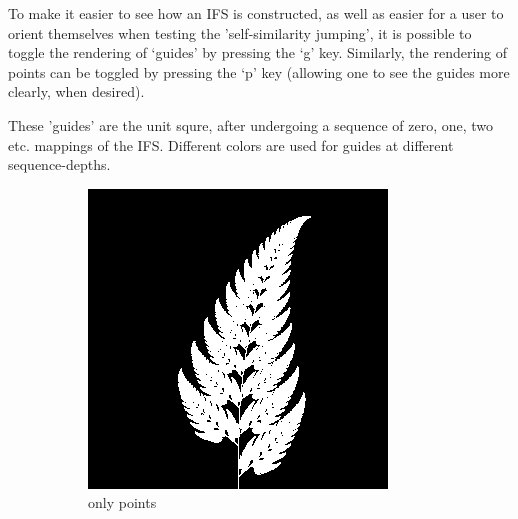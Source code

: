 \documentclass[11pt]{article}
\begin{document}
To make it easier to see how an IFS is constructed, as well as easier for a user to orient themselves when
testing the 'self-similarity jumping', it is possible to toggle the rendering of `guides' by pressing the `g' key.
Similarly, the rendering of points can be toggled by pressing the `p' key (allowing one to see the guides more clearly, when desired).

These 'guides' are the unit squre, after undergoing a sequence of zero, one, two etc. mappings of the IFS.
Different colors are used for guides at different sequence-depths.

\begin{figure}
     \centering
     \begin{subfigure}[b]{0.3\textwidth}
         \centering
         \includegraphics[width=\textwidth]{figures/barnsley_points}
         \caption{only points}
         \label{figure:barnsley_guides}
     \end{subfigure}
     \hfill
     \begin{subfigure}[b]{0.3\textwidth}
         \centering

\end{subfigure}
\end{figure}
\end{document}
